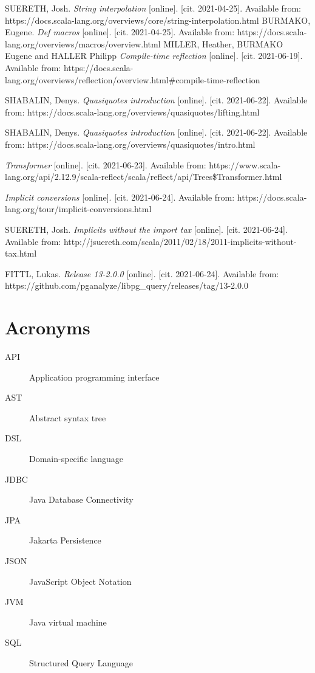 \documentclass[thesis=B,english]{FITthesis}[2019/12/23]
\begin{document}
\begin{thebibliography}{9}
SUERETH, Josh. 
\textit {String interpolation} [online]. [cit. 2021-04-25]. Available from: https://docs.scala-lang.org/overviews/core/string-interpolation.html
BURMAKO, Eugene. 
\textit {Def macros} [online]. [cit. 2021-04-25]. Available from: https://docs.scala-lang.org/overviews/macros/overview.html
MILLER, Heather, BURMAKO Eugene and HALLER Philipp 
\textit {Compile-time reflection} [online]. [cit. 2021-06-19]. Available from: https://docs.scala-lang.org/overviews/reflection/overview.html\#compile-time-reflection

SHABALIN, Denys.
\textit {Quasiquotes introduction} [online]. [cit. 2021-06-22]. Available from:
https://docs.scala-lang.org/overviews/quasiquotes/lifting.html

SHABALIN, Denys.
\textit {Quasiquotes introduction} [online]. [cit. 2021-06-22]. Available from:
https://docs.scala-lang.org/overviews/quasiquotes/intro.html

\textit {Transformer} [online]. [cit. 2021-06-23]. Available from:
https://www.scala-lang.org/api/2.12.9/scala-reflect/scala/reflect/api/Trees\$Transformer.html

\textit {Implicit conversions} [online]. [cit. 2021-06-24]. Available from:
https://docs.scala-lang.org/tour/implicit-conversions.html

SUERETH, Josh.
\textit {Implicits without the import tax} [online]. [cit. 2021-06-24]. Available from: http://jsuereth.com/scala/2011/02/18/2011-implicits-without-tax.html

FITTL, Lukas.
\textit {Release 13-2.0.0} [online]. [cit. 2021-06-24]. Available from:
https://github.com/pganalyze/libpg\_query/releases/tag/13-2.0.0

\end{thebibliography}
\appendix

\chapter{Acronyms}
\begin{description}
	\item[API] Application programming interface
	\item[AST] Abstract syntax tree
	\item[DSL] Domain-specific language
	\item[JDBC] Java Database Connectivity
	\item[JPA] Jakarta Persistence
	\item[JSON] JavaScript Object Notation
	\item[JVM] Java virtual machine
	\item[SQL] Structured Query Language
\end{description}
\end{document}
